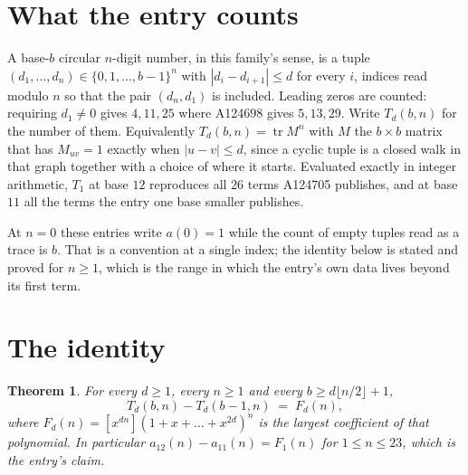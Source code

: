 \documentclass[11pt,a4paper]{article}
\theoremstyle{plain}
\newtheorem{theorem}{Theorem}
\theoremstyle{definition}
\begin{document}
\section{What the entry counts}

A base-$b$ circular $n$-digit number, in this family's sense, is a tuple
$(d_1,\dots,d_n)\in\{0,1,\dots,b-1\}^{n}$ with $|d_i-d_{i+1}|\le d$ for every $i$, indices
read modulo $n$ so that the pair $(d_n,d_1)$ is included. Leading zeros are counted: requiring
$d_1\ne0$ gives $4,11,25$ where A124698 gives $5,13,29$. Write $T_d(b,n)$ for the number of
them. Equivalently $T_d(b,n)=\operatorname{tr}M^{n}$ with $M$ the $b\times b$ matrix that has
$M_{uv}=1$ exactly when $|u-v|\le d$, since a cyclic tuple is a closed walk in that graph
together with a choice of where it starts. Evaluated exactly in integer arithmetic, $T_{1}$
at base $12$ reproduces all $26$ terms A124705 publishes, and at base $11$ all the
terms the entry one base smaller publishes.

At $n=0$ these entries write $a(0)=1$ while the count of empty tuples read as a trace is $b$.
That is a convention at a single index; the identity below is stated and proved for $n\ge1$,
which is the range in which the entry's own data lives beyond its first term.

\section{The identity}

\begin{theorem}
For every $d\ge1$, every $n\ge1$ and every $b\ge d\lfloor n/2\rfloor+1$,
\[
T_d(b,n)-T_d(b-1,n)\;=\;F_d(n),
\]
where $F_d(n)=[x^{dn}](1+x+\dots+x^{2d})^{n}$ is the largest coefficient of that
polynomial. In particular $a_{12}(n)-a_{11}(n)=F_{1}(n)$ for $1\le n\le23$, which
is the entry's claim.
\end{theorem}
\end{document}
